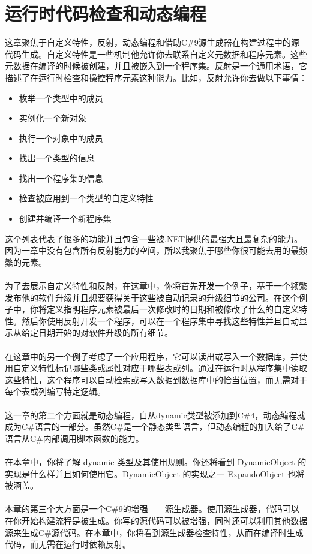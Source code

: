 \section{运行时代码检查和动态编程}
这章聚焦于自定义特性，反射，动态编程和借助C\#9源生成器在构建过程中的源代码生成。自定义特性是一些机制他允许你去联系自定义元数据和程序元素。这些元数据在编译的时候被创建，并且被嵌入到一个程序集。反射是一个通用术语，它描述了在运行时检查和操控程序元素这种能力。比如，反射允许你去做以下事情：
\begin{itemize}
    \item 枚举一个类型中的成员
    \item 实例化一个新对象
    \item 执行一个对象中的成员
    \item 找出一个类型的信息
    \item 找出一个程序集的信息
    \item 检查被应用到一个类型的自定义特性
    \item 创建并编译一个新程序集
\end{itemize}
这个列表代表了很多的功能并且包含一些被.NET提供的最强大且最复杂的能力。因为一章中没有包含所有反射能力的空间，所以我聚焦于哪些你很可能去用的最频繁的元素。
\\ \\
为了去展示自定义特性和反射，在这章中，你将首先开发一个例子，基于一个频繁发布他的软件升级并且想要获得关于这些被自动记录的升级细节的公司。在这个例子中，你将定义指明程序元素被最后一次修改时的日期和被修改了什么的自定义特性。然后你使用反射开发一个程序，可以在一个程序集中寻找这些特性并且自动显示从给定日期开始的对软件升级的所有细节。
\\ \\
在这章中的另一个例子考虑了一个应用程序，它可以读出或写入一个数据库，并使用自定义特性标记哪些类或属性对应于哪些表或列。通过在运行时从程序集中读取这些特性，这个程序可以自动检索或写入数据到数据库中的恰当位置，而无需对于每个表或列编写特定逻辑。
\\ \\
这一章的第二个方面就是动态编程，自从dynamic类型被添加到C\#4，动态编程就成为C\#语言的一部分。虽然C\#是一个静态类型语言，但动态编程的加入给了C\#语言从C\#内部调用脚本函数的能力。
\\ \\
在本章中，你将了解 dynamic 类型及其使用规则。你还将看到 DynamicObject 的实现是什么样并且如何使用它。DynamicObject 的实现之一 ExpandoObject 也将被涵盖。
\\ \\
本章的第三个大方面是一个C\#9的增强——源生成器。使用源生成器，代码可以在你开始构建流程是被生成。你写的源代码可以被增强，同时还可以利用其他数据源来生成C\#源代码。在本章中，你将看到源生成器检查特性，从而在编译时生成代码，而无需在运行时依赖反射。

